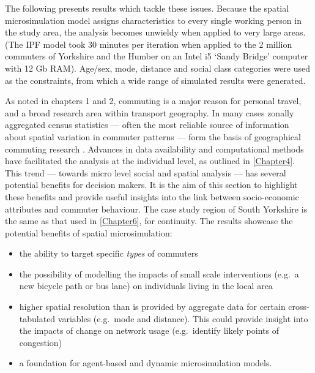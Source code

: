 \documentclass[a4paper, 11pt, twoside]{Thesis}
\begin{document}
The following presents results which tackle these issues.
Because the spatial microsimulation model assigns characteristics to every single
working person in the study area, the analysis becomes unwieldy when applied to
very large areas. (The IPF model took 30 minutes per iteration when applied
to the 2 million commuters of Yorkshire and the Humber on an Intel i5 `Sandy
Bridge' computer with 12 Gb RAM). Age/sex, mode,
distance and social class categories were used as the constraints, from which
a wide range of simulated results were generated.

As noted in chapters 1 and 2, commuting is a major reason for personal travel,
and a broad research area within transport geography. In many cases zonally
aggregated census statistics --- often the most reliable source of
information about spatial variation in commuter patterns --- form the basis of
geographical commuting research
\citep{Horner2002,Titheridge2006}.
Advances in data availability
and computational methods  have facilitated
the analysis at the individual level, as outlined in \cref{Chapter4}.
This trend --- towards micro level social and spatial analysis
--- has several potential benefits
for decision makers. It is the aim of this section to highlight these benefits
and provide useful insights into the link between socio-economic attributes
and commuter behaviour. The case study region of South Yorkshire is the same
as that used in \cref{Chapter6}, for continuity. The results showcase the
potential benefits of spatial microsimulation:
\begin{itemize}
 \item the ability to target specific \emph{types} of commuters
\item the possibility of modelling the impacts of small scale interventions
(e.g.~a new bicycle path or bus lane) on individuals living in the local area
\item higher spatial resolution than is provided by aggregate data for certain
cross-tabulated variables (e.g.~mode and distance). This could provide insight
into the impacts of change on network usage (e.g.~identify likely points of
congestion)
\item a foundation for agent-based and dynamic microsimulation models.
\end{itemize}
\end{document}
